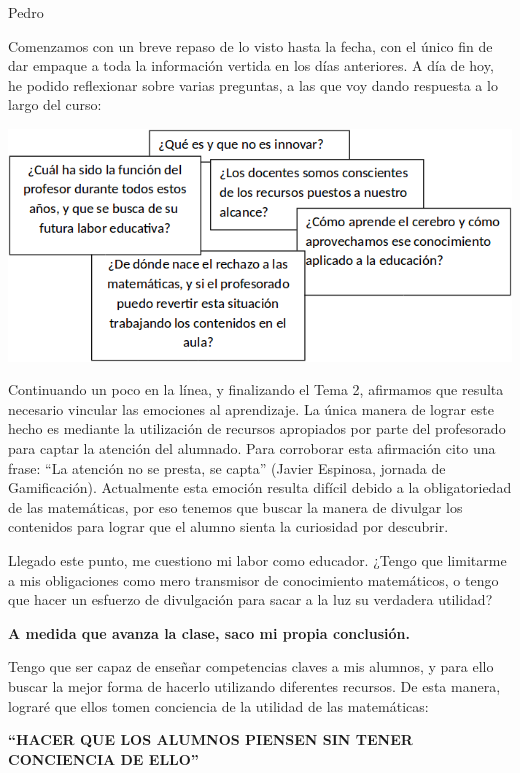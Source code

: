 \begin{opin}{\pedrocolor}{Pedro}


Comenzamos con un breve repaso de lo visto hasta la fecha, con el único fin de dar empaque a toda la información vertida en los días anteriores. A día de hoy, he podido reflexionar sobre varias preguntas, a las que voy dando respuesta a lo largo del curso:

\begin{minipage}[hbtp]{1.0\linewidth}
\centering
\includegraphics[scale=0.5]{img/pedro2.png}
\end{minipage}

Continuando un poco en la línea, y finalizando el Tema 2, afirmamos que resulta necesario vincular las emociones al aprendizaje. La única manera de lograr este hecho es mediante la utilización de recursos apropiados por parte del profesorado para captar la atención del alumnado. Para corroborar esta afirmación cito una frase: “La atención no se presta, se capta” (Javier Espinosa, jornada de Gamificación). Actualmente esta emoción resulta difícil debido a la obligatoriedad de las matemáticas, por eso tenemos que buscar la manera de divulgar los contenidos para lograr que el alumno sienta la curiosidad por descubrir.

 
Llegado este punto, me cuestiono mi labor como educador. ¿Tengo que limitarme a mis obligaciones como mero transmisor de conocimiento matemáticos, o tengo que hacer un esfuerzo de divulgación para sacar a la luz su verdadera utilidad?

\textbf{A medida que avanza la clase, saco mi propia conclusión.}

Tengo que ser capaz de enseñar competencias claves a mis alumnos, y para ello buscar la mejor forma de hacerlo utilizando diferentes recursos. De esta manera, lograré que ellos tomen conciencia de la utilidad de las matemáticas:

\begin{center}
\textbf{“HACER QUE LOS ALUMNOS PIENSEN SIN TENER CONCIENCIA DE ELLO”}
\end{center}


\end{opin}
